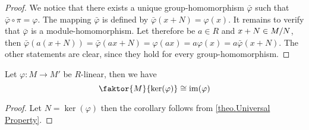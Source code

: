 \begin{center}
\end{center}


\begin{proof}
We notice that there exists a unique group-homomorphism $\bar{\varphi}$ such that $\bar{\varphi}\circ\pi=\varphi$. The mapping $\bar{\varphi}$ is defined by $\bar{\varphi}(x+N)=\varphi(x)$. It remains to verify that $\bar{\varphi}$ is a module-homomorphism. Let therefore be $a\in R$ and $x+N\in M/N$, then $\bar{\varphi}(a(x+N))=\bar{\varphi}(ax+N)=\varphi(ax)=a\varphi(x)=a\bar{\varphi}(x+N)$. The other statements are clear, since they hold for every group-homomorphism.
\end{proof}

\begin{cor} \label{cor.Homomorphism Theorem}
Let $\varphi\colon M\to M'$ be $R$-linear, then we have
\begin{equation*}
\faktor{M}{\ker(\varphi)}\cong\im(\varphi)
\end{equation*}
\end{cor}
\begin{proof}
Let $N=\ker(\varphi)$ then the corollary follows from \cref{theo.Universal Property}.
\end{proof}

